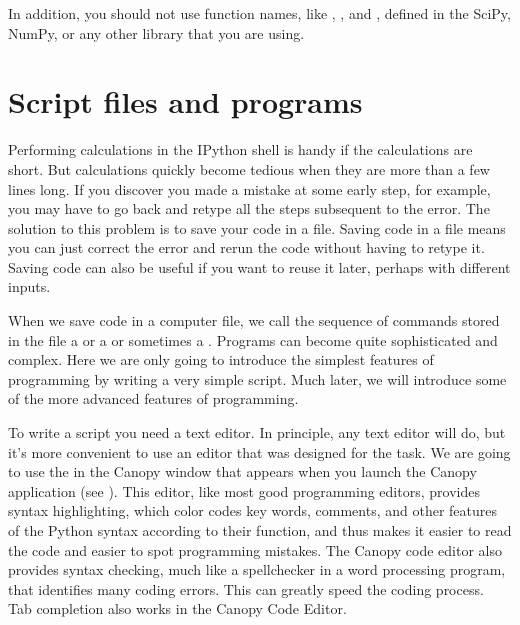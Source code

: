 \documentclass[letterpaper,10pt,english]{sphinxmanual}
\begin{document}
\sphinxAtStartPar
In addition, you should not use function names, like , , and , defined in the SciPy, NumPy, or any other library that you are using.

\ignorespaces 

\section{Script files and programs}
\label{\detokenize{chap2/chap2_basics:script-files-and-programs}}\label{\detokenize{chap2/chap2_basics:index-16}}
\sphinxAtStartPar
Performing calculations in the IPython shell is handy if the calculations are short.  But calculations quickly become tedious when they are more than a few lines long.  If you discover you made a mistake at some early step, for example, you may have to go back and retype all the steps subsequent to the error.  The solution to this problem is to save your code in a file.  Saving code in a file means you can just correct the error and rerun the code without having to retype it.  Saving code can also be useful if you want to reuse it later, perhaps with different inputs.

\sphinxAtStartPar
When we save code in a computer file, we call the sequence of commands stored in the file a  or a  or sometimes a .  Programs can become quite sophisticated and complex.  Here we are only going to introduce the simplest features of programming by writing a very simple script.  Much later, we will introduce some of the more advanced features of programming.

\ignorespaces 
\sphinxAtStartPar
To write a script you need a text editor.  In principle, any text editor will do, but it’s more convenient to use an editor that was designed for the task.  We are going to use the  in the Canopy window that appears when you launch the Canopy application (see  {\hyperref[\detokenize{chap2/chap2_basics:fig-canopywindow}]{}}).  This editor, like most good programming editors, provides syntax highlighting, which color codes key words, comments, and other features of the Python syntax according to their function, and thus makes it easier to read the code and easier to spot programming mistakes.  The Canopy code editor also provides syntax checking, much like a spell\sphinxhyphen{}checker in a word processing program, that identifies many coding errors.  This can greatly speed the coding process.  Tab completion also works in the Canopy Code Editor.
\end{document}

